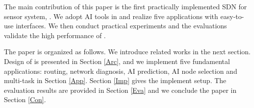 The main contribution of this paper is the first practically implemented SDN for sensor system, {\sdn}. 
We adopt AI tools in {\sdn} and realize five applications with easy-to-use interfaces.
We then conduct practical experiments and the evaluations validate the high performance of {\sdn}.

The paper is organized as follows. We introduce related works in the next section. 
Design of {\sdn} is presented in Section \ref{Arc}, 
and we implement five fundamental applications: routing, network diagnosis, 
AI prediction, AI node selection and multi-task in Section \ref{App}. 
Section \ref{Imp} gives the implement setup.
The evaluation results are provided in Section \ref{Eva} 
and we conclude the paper in Section \ref{Con}.


